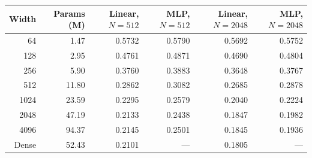 \begin{tabular}{rrrrrr}
\toprule
Width & Params (M) & Linear, $N{=}512$ & MLP, $N{=}512$ & Linear, $N{=}2048$ & MLP, $N{=}2048$ \\
\midrule
64 & 1.47 & 0.5732 & 0.5790 & 0.5692 & 0.5752 \\
128 & 2.95 & 0.4761 & 0.4871 & 0.4690 & 0.4804 \\
256 & 5.90 & 0.3760 & 0.3883 & 0.3648 & 0.3767 \\
512 & 11.80 & 0.2862 & 0.3082 & 0.2685 & 0.2878 \\
1024 & 23.59 & 0.2295 & 0.2579 & 0.2040 & 0.2224 \\
2048 & 47.19 & 0.2133 & 0.2438 & 0.1847 & 0.1982 \\
4096 & 94.37 & 0.2145 & 0.2501 & 0.1845 & 0.1936 \\
\midrule
Dense & 52.43 & 0.2101 & --- & 0.1805 & --- \\
\bottomrule
\end{tabular}
